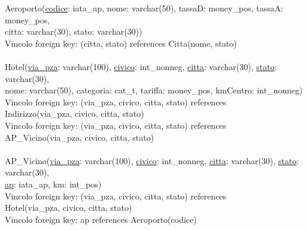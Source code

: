 \documentclass[a4paper,12pt]{report}
\begin{document}
      \hspace*{-0.75cm}
      Aeroporto(\underline{codice}: iata\_ap, nome: varchar(50), tassaD: money\_pos, tassaA: money\_pos, \\
      \hspace*{2cm}citta: varchar(30), stato: varchar(30)) \\
      \hspace*{1cm} Vincolo foreign key: (citta, stato) references Citta(nome, stato) \\ \\

      \hspace*{-0.75cm}
      Hotel(\underline{via\_pza}: varchar(100), \underline{civico}: int\_nonneg, \underline{citta}: varchar(30), \underline{stato}: varchar(30), \\
      \hspace*{2cm}nome: varchar(50), categoria: cat\_t, tariffa: money\_pos, kmCentro: int\_nonneg) \\
      \hspace*{1cm} Vincolo foreign key: (via\_pza, civico, citta, stato) references \\
      \hspace*{2cm}Indirizzo(via\_pza, civico, citta, stato) \\
      \hspace*{1cm} Vincolo foreign key: (via\_pza, civico, citta, stato) references \\
      \hspace*{2cm}AP\_Vicino(via\_pza, civico, citta, stato) \\ \\

      \hspace*{-0.75cm}
      AP\_Vicino(\underline{via\_pza}: varchar(100), \underline{civico}: int\_nonneg, \underline{citta}: varchar(30), \underline{stato}: varchar(30), \\
      \hspace*{2cm}\underline{ap}: iata\_ap, km: int\_pos) \\
      \hspace*{1cm} Vincolo foreign key: (via\_pza, civico, citta, stato) references \\
      \hspace*{2cm}Hotel(via\_pza, civico, citta, stato) \\
      \hspace*{1cm} Vincolo foreign key: ap references Aeroporto(codice) \\ \\
\end{document}
